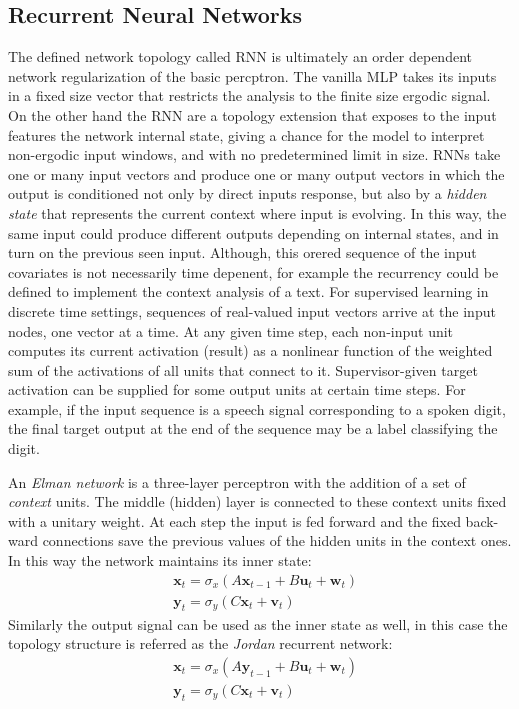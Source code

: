 \subsection{Recurrent Neural Networks}
The defined network topology called \acl{RNN} is ultimately an order dependent network regularization of the basic percptron. The vanilla \acs{MLP} takes its inputs in a fixed size vector that restricts the analysis to the finite size ergodic signal. On the other hand the \acs{RNN} are a topology extension that exposes to the input features the network internal state, giving a chance for the model to interpret non-ergodic input windows, and with no predetermined limit in size. \acs{RNN}s take one or many input vectors and produce one or many output vectors in which the output is conditioned not only by direct inputs response, but also by a \textit{hidden state} that represents the current context where input is evolving. In this way, the same input could produce different outputs depending on internal states, and in turn on the previous seen input. Although, this orered sequence of the input covariates is not necessarily time depenent, for example the recurrency could be defined to implement the context analysis of a text.
%
For supervised learning in discrete time settings, sequences of real-valued input vectors arrive at the input nodes, one vector at a time. At any given time step, each non-input unit computes its current activation (result) as a nonlinear function of the weighted sum of the activations of all units that connect to it. Supervisor-given target activation can be supplied for some output units at certain time steps. For example, if the input sequence is a speech signal corresponding to a spoken digit, the final target output at the end of the sequence may be a label classifying the digit.

An \textit{Elman network} is a three-layer perceptron with the addition of a set of \textit{context} units. The middle (hidden) layer is connected to these context units fixed with a unitary weight. At each step the input is fed forward and the fixed back-ward connections save the previous values of the hidden units in the context ones. In this way the network maintains its inner state:
\begin{align}
    & \bm{x}_t = \sigma_x\left( A\bm{x}_{t-1} + B\bm{u}_t + \bm{w}_t \right) \\
    & \bm{y}_t = \sigma_y\left( C\bm{x}_t + \bm{v}_t \right)
    \label{eq:elman_model}
\end{align}
Similarly the output signal can be used as the inner state as well, in this case the topology structure is referred as the \textit{Jordan} recurrent network:
\begin{align}
    & \bm{x}_t = \sigma_x\left( A\bm{y}_{t-1} + B\bm{u}_t + \bm{w}_t \right) \\
    & \bm{y}_t = \sigma_y\left( C\bm{x}_t + \bm{v}_t \right)
    \label{eq:jordan_model}
\end{align}

